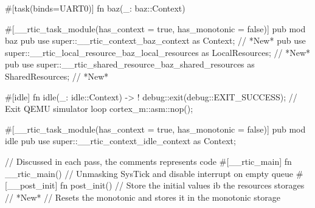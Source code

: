 {    #[task(binds=UART0)]
    fn baz(_: baz::Context){
    }
    
    #[__rtic_task_module(has_context = true, has_monotonic = false)]
    pub mod baz {
        pub use super::__rtic_context_baz_context as Context; // *New*
        pub use super::__rtic_local_resource_baz_local_resources as LocalResources; // *New*
        pub use super::__rtic_shared_resource_baz_shared_resources as SharedResources; // *New*
    }

    #[idle]
    fn idle(_: idle::Context) -> ! {
        debug::exit(debug::EXIT_SUCCESS); // Exit QEMU simulator
        loop {
            cortex_m::asm::nop();
        }
    }

    #[__rtic_task_module(has_context = true, has_monotonic = false)]
    pub mod idle {
        pub use super::__rtic_context_idle_context as Context;
    }

    // Discussed in each pass, the comments represents code
    #[__rtic_main]
    fn __rtic_main() {
        // Unmasking SysTick and disable interrupt on empty queue
        #[__post_init]
        fn post_init() {
            // Store the initial values ib the resources storages // *New*
            // Resets the monotonic and stores it in the monotonic storage
        }
    }
}